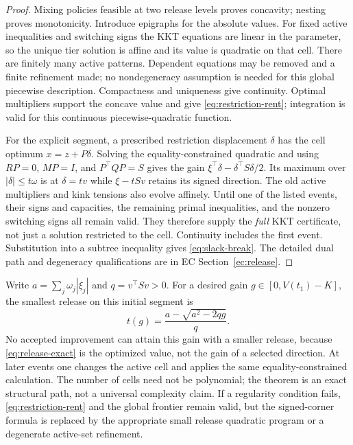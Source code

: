 \documentclass[11pt,letterpaper]{article}
\theoremstyle{definition}\newtheorem{assumption}[theorem]{Assumption}
\begin{document}
\begin{proof}
Mixing policies feasible at two release levels proves concavity; nesting proves monotonicity. Introduce epigraphs for the absolute values. For fixed active inequalities and switching signs the KKT equations are linear in the parameter, so the unique tier solution is affine and its value is quadratic on that cell. There are finitely many active patterns. Dependent equations may be removed and a finite refinement made; no nondegeneracy assumption is needed for this global piecewise description. Compactness and uniqueness give continuity. Optimal multipliers support the concave value and give \eqref{eq:restriction-rent}; integration is valid for this continuous piecewise-quadratic function.

For the explicit segment, a prescribed restriction displacement $\delta$ has the cell optimum $x=z+P\delta$. Solving the equality-constrained quadratic and using
$RP=0$, $MP=I$, and $P^\top QP=S$ gives the gain
$\xi^\top\delta-\delta^\top S\delta/2$. Its maximum over $|\delta|\leq t\omega$ is at $\delta=tv$ while $\xi-tSv$ retains its signed direction. The old active multipliers and kink tensions also evolve affinely. Until one of the listed events, their signs and capacities, the remaining primal inequalities, and the nonzero switching signs all remain valid. They therefore supply the \emph{full} KKT certificate, not just a solution restricted to the cell. Continuity includes the first event. Substitution into a subtree inequality gives \eqref{eq:slack-break}. The detailed dual path and degeneracy qualifications are in EC Section~\ref{ec:release}.\end{proof}

Write $a=\sum_j\omega_j|\xi_j|$ and $q=v^\top Sv>0$. For a desired gain $g\in[0,V(t_1)-K]$, the smallest release on this initial segment is
\begin{equation}\label{eq:target}
 t(g)=\frac{a-\sqrt{a^2-2qg}}q.
\end{equation}
No accepted improvement can attain this gain with a smaller release, because \eqref{eq:release-exact} is the optimized value, not the gain of a selected direction. At later events one changes the active cell and applies the same equality-constrained calculation. The number of cells need not be polynomial; the theorem is an exact structural path, not a universal complexity claim. If a regularity condition fails, \eqref{eq:restriction-rent} and the global frontier remain valid, but the signed-corner formula is replaced by the appropriate small release quadratic program or a degenerate active-set refinement.
\end{document}
